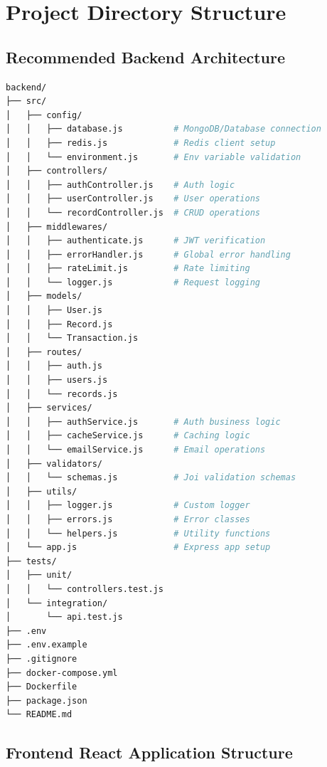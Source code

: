 
\section{Project Directory Structure}

\subsection{Recommended Backend Architecture}

\begin{lstlisting}[language=bash, caption=Clean Backend Project Structure]
backend/
├── src/
│   ├── config/
│   │   ├── database.js          # MongoDB/Database connection
│   │   ├── redis.js             # Redis client setup
│   │   └── environment.js       # Env variable validation
│   ├── controllers/
│   │   ├── authController.js    # Auth logic
│   │   ├── userController.js    # User operations
│   │   └── recordController.js  # CRUD operations
│   ├── middlewares/
│   │   ├── authenticate.js      # JWT verification
│   │   ├── errorHandler.js      # Global error handling
│   │   ├── rateLimit.js         # Rate limiting
│   │   └── logger.js            # Request logging
│   ├── models/
│   │   ├── User.js
│   │   ├── Record.js
│   │   └── Transaction.js
│   ├── routes/
│   │   ├── auth.js
│   │   ├── users.js
│   │   └── records.js
│   ├── services/
│   │   ├── authService.js       # Auth business logic
│   │   ├── cacheService.js      # Caching logic
│   │   └── emailService.js      # Email operations
│   ├── validators/
│   │   └── schemas.js           # Joi validation schemas
│   ├── utils/
│   │   ├── logger.js            # Custom logger
│   │   ├── errors.js            # Error classes
│   │   └── helpers.js           # Utility functions
│   └── app.js                   # Express app setup
├── tests/
│   ├── unit/
│   │   └── controllers.test.js
│   └── integration/
│       └── api.test.js
├── .env
├── .env.example
├── .gitignore
├── docker-compose.yml
├── Dockerfile
├── package.json
└── README.md
\end{lstlisting}

\subsection{Frontend React Application Structure}

